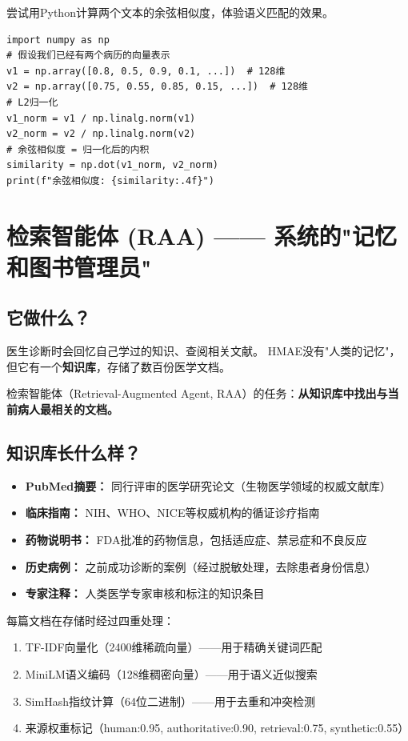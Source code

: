 \documentclass[11pt,a4paper]{ctexart}
\begin{document}
\begin{codebox}
尝试用Python计算两个文本的余弦相似度，体验语义匹配的效果。
\small
\begin{verbatim}
import numpy as np
# 假设我们已经有两个病历的向量表示
v1 = np.array([0.8, 0.5, 0.9, 0.1, ...])  # 128维
v2 = np.array([0.75, 0.55, 0.85, 0.15, ...])  # 128维
# L2归一化
v1_norm = v1 / np.linalg.norm(v1)
v2_norm = v2 / np.linalg.norm(v2)
# 余弦相似度 = 归一化后的内积
similarity = np.dot(v1_norm, v2_norm)
print(f"余弦相似度: {similarity:.4f}")
\end{verbatim}
\normalsize
\end{codebox}

\newpage

\section{检索智能体 (RAA) —— 系统的"记忆和图书管理员"}

\subsection{它做什么？}

医生诊断时会回忆自己学过的知识、查阅相关文献。
HMAE没有"人类的记忆"，但它有一个\textbf{知识库}，存储了数百份医学文档。

检索智能体（Retrieval-Augmented Agent, RAA）的任务：\textbf{从知识库中找出与当前病人最相关的文档。}

\subsection{知识库长什么样？}

\begin{itemize}[nosep]
\item \textbf{PubMed摘要：} 同行评审的医学研究论文（生物医学领域的权威文献库）
\item \textbf{临床指南：} NIH、WHO、NICE等权威机构的循证诊疗指南
\item \textbf{药物说明书：} FDA批准的药物信息，包括适应症、禁忌症和不良反应
\item \textbf{历史病例：} 之前成功诊断的案例（经过脱敏处理，去除患者身份信息）
\item \textbf{专家注释：} 人类医学专家审核和标注的知识条目
\end{itemize}

每篇文档在存储时经过四重处理：
\begin{enumerate}[nosep]
\item TF-IDF向量化（2400维稀疏向量）——用于精确关键词匹配
\item MiniLM语义编码（128维稠密向量）——用于语义近似搜索
\item SimHash指纹计算（64位二进制）——用于去重和冲突检测
\item 来源权重标记（human:0.95, authoritative:0.90, retrieval:0.75, synthetic:0.55）
\end{enumerate}
\end{document}
